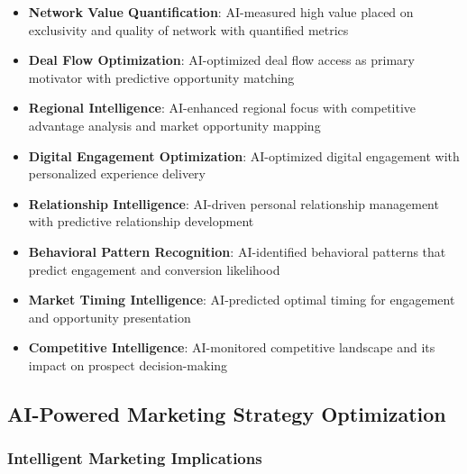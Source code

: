 \begin{itemize}
    \item \textbf{Network Value Quantification}: AI-measured high value placed on exclusivity and quality of network with quantified metrics
    \item \textbf{Deal Flow Optimization}: AI-optimized deal flow access as primary motivator with predictive opportunity matching
    \item \textbf{Regional Intelligence}: AI-enhanced regional focus with competitive advantage analysis and market opportunity mapping
    \item \textbf{Digital Engagement Optimization}: AI-optimized digital engagement with personalized experience delivery
    \item \textbf{Relationship Intelligence}: AI-driven personal relationship management with predictive relationship development
    \item \textbf{Behavioral Pattern Recognition}: AI-identified behavioral patterns that predict engagement and conversion likelihood
    \item \textbf{Market Timing Intelligence}: AI-predicted optimal timing for engagement and opportunity presentation
    \item \textbf{Competitive Intelligence}: AI-monitored competitive landscape and its impact on prospect decision-making
\end{itemize}

\subsection{AI-Powered Marketing Strategy Optimization}

\subsubsection{Intelligent Marketing Implications}

